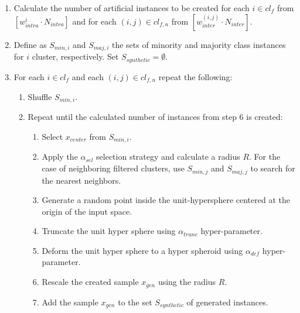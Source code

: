 \documentclass[parskip=full]{scrartcl}
\begin{document}
\begin{algorithm}[H]
\begin{enumerate}
		\item Calculate the number of artificial instances to be created for
			  each $i \in cl_{f}$ from $[w^{i}_{intra} \cdot N_{intra}]$ and for
			  each $(i, j) \in cl_{f, n}$ from $[w^{(i, j)}_{inter} \cdot N_{inter}]$.

		\item Define as $S_{min, i}$ and $S_{maj, i}$ the sets of minority and
			  majority class instances for $i$ cluster, respectively. 
			  Set $S_{synthetic} = \emptyset$.
	
		\item For each $i \in cl_{f}$ and each $(i, j) \in cl_{f, n}$ repeat the following:
		
			\begin{enumerate}[label*=\arabic*.]
		
			\item Shuffle $S_{min, i}$. 
		
			\item Repeat until the calculated number of instances from step 6 is created:
				  
				\begin{enumerate}[label*=\arabic*.]

				\item Select $x_{center}$ from $S_{min, i}$.
				
				\item Apply the $\alpha_{sel}$ selection strategy and calculate
					  a radius $R$. For the case of neighboring filtered
					  clusters, use $S_{min, j}$ and $S_{maj, j}$ to search for
					  the nearest neighbors.
				
				\item Generate a random point inside the unit-hypersphere
					  centered at the origin of the input space.
				
				\item Truncate the unit hyper sphere using $\alpha_{trunc}$
					  hyper-parameter.
				
				\item Deform the unit hyper sphere to a hyper spheroid using
					  $\alpha_{def}$ hyper-parameter.
				
				\item Rescale the created sample $x_{gen}$ using the radius $R$.
				
				\item Add the sample $x_{gen}$ to the set $S_{synthetic}$ of
					  generated instances.

				\end{enumerate}

			\end{enumerate}

	\end{enumerate}


\end{algorithm}
\end{document}
